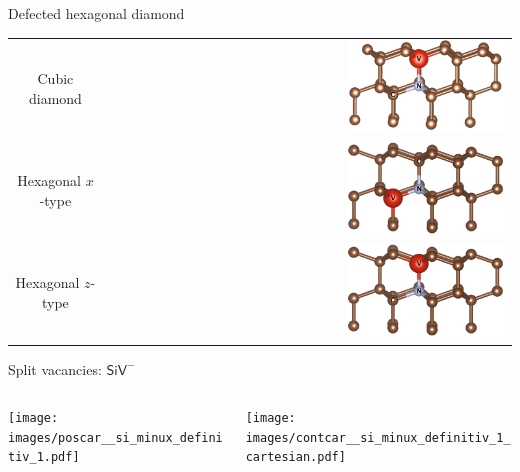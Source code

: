 \documentclass[notes=show]{beamer}
\begin{document}
\begin{frame}{Defected hexagonal diamond}
  \begin{center}
    \begin{tabular}{cr}
      Cubic diamond   & \includegraphics[width=0.4\textwidth]{images/POSCAR_16_view.png}\\
      Hexagonal $ x $-type &\includegraphics[width=0.4\textwidth]{images/POSCAR_16_x_view.png}\\
      Hexagonal $ z $-type & \includegraphics[width=0.4\textwidth]{images/POSCAR_16_z_view.png}
    \end{tabular}
  \end{center}

\end{frame}



\begin{frame}{Split vacancies: $ \mathsf{SiV}^{-} $  }
  \def\splitTrim{6}
  \def\splitTrimVertical{2}
  \begin{columns}
    \begin{column}{0.5\textwidth}
      \texttt{[image: images/poscar\_\_si\_minux\_definitiv\_1.pdf]}
    \end{column}
    \begin{column}{0.5\textwidth}
      \texttt{[image: images/contcar\_\_si\_minux\_definitiv\_1\_cartesian.pdf]}
    \end{column}
  \end{columns}
\end{frame}
\end{document}
